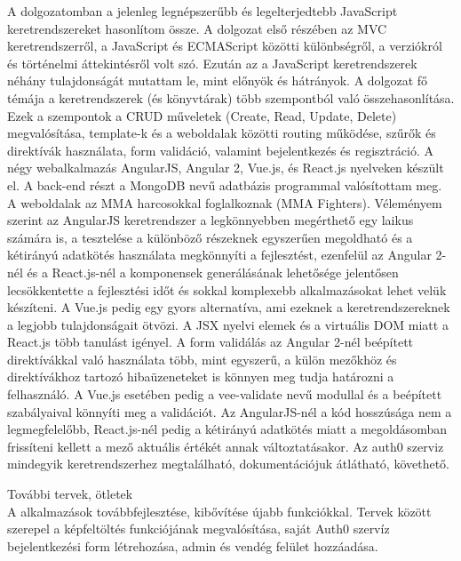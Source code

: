 
A dolgozatomban a jelenleg legnépszerűbb és legelterjedtebb JavaScript keretrendszereket hasonlítom össze. A dolgozat első részében az MVC keretrendszerről, a JavaScript és ECMAScript közötti különbségről, a verziókról és történelmi áttekintésről volt szó. Ezután az a JavaScript keretrendszerek néhány tulajdonságát mutattam le, mint előnyök és hátrányok. 
A dolgozat fő témája a keretrendszerek (és könyvtárak) több szempontból való összehasonlítása. Ezek a szempontok a CRUD műveletek (Create, Read, Update, Delete) megvalósítása, template-k és a weboldalak közötti routing működése, szűrők és direktívák használata, form validáció, valamint bejelentkezés és regisztráció. 
A négy webalkalmazás AngularJS, Angular 2, Vue.js, és React.js nyelveken készült el. A back-end részt a MongoDB nevű adatbázis programmal valósítottam meg. A weboldalak az MMA harcosokkal foglalkoznak (MMA Fighters).
Véleményem szerint az AngularJS keretrendszer a legkönnyebben megérthető egy laikus számára is, a tesztelése a különböző részeknek egyszerűen megoldható és a kétirányú adatkötés használata megkönnyíti a fejlesztést, ezenfelül az Angular 2-nél és a React.js-nél a komponensek generálásának lehetősége jelentősen lecsökkentette a fejlesztési időt és sokkal komplexebb alkalmazásokat lehet velük készíteni. A Vue.js pedig egy gyors alternatíva, ami ezeknek a keretrendszereknek a legjobb tulajdonságait ötvözi. A JSX nyelvi elemek és a virtuális DOM miatt a React.js több tanulást igényel.
A form validálás az Angular 2-nél beépített direktívákkal való használata több, mint egyszerű, a külön mezőkhöz és direktívákhoz tartozó hibaüzeneteket is könnyen meg tudja határozni a felhasználó. A Vue.js esetében pedig a vee-validate nevű modullal és a beépített szabályaival könnyíti meg a validációt. Az AngularJS-nél a kód hosszúsága nem a legmegfelelőbb, React.js-nél pedig a kétirányú adatkötés miatt a megoldásomban frissíteni kellett a mező aktuális értékét annak változtatásakor.
Az auth0 szerviz mindegyik keretrendszerhez megtalálható, dokumentációjuk átlátható, követhető. 

További tervek, ötletek \\
A alkalmazások továbbfejlesztése, kibővítése újabb funkciókkal. Tervek között szerepel a képfeltöltés funkciójának megvalósítása, saját Auth0 szervíz bejelentkezési form létrehozása, admin és vendég felület hozzáadása.

